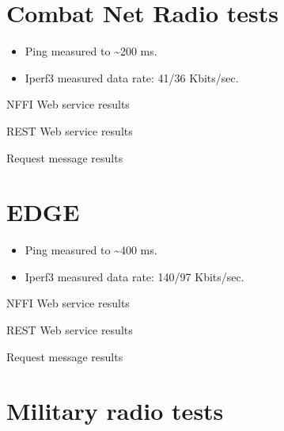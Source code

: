 \begin{appendices}
\section{Combat Net Radio tests}

\begin{itemize}
	\item Ping measured to \textasciitilde 200 ms.
	\item Iperf3 measured data rate: 41/36 Kbits/sec.
\end{itemize}

\begin{table}[H]

\caption{NFFI Web service results}
\end{table}


\begin{table}[H]

\caption{REST Web service results}
\end{table}


\begin{table}[H]

\caption{Request message results}
\end{table}

\section{EDGE}

\begin{itemize}
	\item Ping measured to \textasciitilde 400 ms.
	\item Iperf3 measured data rate: 140/97 Kbits/sec.
\end{itemize}

\begin{table}[H]

\caption{NFFI Web service results}
\end{table}


\begin{table}[H]

\caption{REST Web service results}
\end{table}

\begin{table}[H]

\caption{Request message results}
\end{table}

\section{Military radio tests}


\end{appendices}
